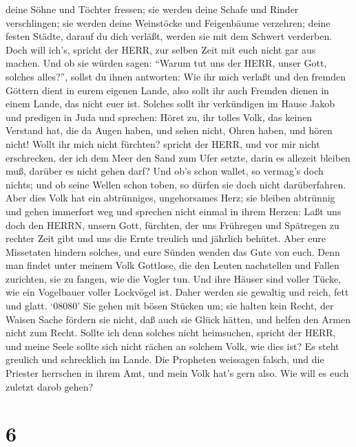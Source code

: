 deine Söhne und Töchter fressen; sie werden deine Schafe und Rinder
verschlingen; sie werden deine Weinstöcke und Feigenbäume verzehren;
deine festen Städte, darauf du dich verläßt, werden sie mit dem Schwert
verderben.  Doch will ich's, spricht der HERR, zur selben
Zeit mit euch nicht gar aus machen.  Und ob sie würden
sagen: ``Warum tut uns der HERR, unser Gott, solches alles?'', sollst du
ihnen antworten: Wie ihr mich verlaßt und den fremden Göttern dient in
eurem eigenen Lande, also sollt ihr auch Fremden dienen in einem Lande,
das nicht euer ist.  Solches sollt ihr verkündigen im Hause
Jakob und predigen in Juda und sprechen:  Höret zu, ihr
tolles Volk, das keinen Verstand hat, die da Augen haben, und sehen
nicht, Ohren haben, und hören nicht!  Wollt ihr mich nicht
fürchten? spricht der HERR, und vor mir nicht erschrecken, der ich dem
Meer den Sand zum Ufer setzte, darin es allezeit bleiben muß, darüber es
nicht gehen darf? Und ob's schon wallet, so vermag's doch nichts; und ob
seine Wellen schon toben, so dürfen sie doch nicht darüberfahren.
 Aber dies Volk hat ein abtrünniges, ungehorsames Herz; sie
bleiben abtrünnig und gehen immerfort weg  und sprechen
nicht einmal in ihrem Herzen: Laßt uns doch den HERRN, unsern Gott,
fürchten, der uns Frühregen und Spätregen zu rechter Zeit gibt und uns
die Ernte treulich und jährlich behütet.  Aber eure
Missetaten hindern solches, und eure Sünden wenden das Gute von euch.
 Denn man findet unter meinem Volk Gottlose, die den Leuten
nachstellen und Fallen zurichten, sie zu fangen, wie die Vogler tun.
 Und ihre Häuser sind voller Tücke, wie ein Vogelbauer
voller Lockvögel ist. Daher werden sie gewaltig und reich, fett und
glatt.  `08080' Sie gehen mit bösen Stücken um; sie halten
kein Recht, der Waisen Sache fördern sie nicht, daß auch sie Glück
hätten, und helfen den Armen nicht zum Recht.  Sollte ich
denn solches nicht heimsuchen, spricht der HERR, und meine Seele sollte
sich nicht rächen an solchem Volk, wie dies ist?  Es steht
greulich und schrecklich im Lande.  Die Propheten weissagen
falsch, und die Priester herrschen in ihrem Amt, und mein Volk hat's
gern also. Wie will es euch zuletzt darob gehen?

\hypertarget{section-5}{%
\section{6}\label{section-5}}

